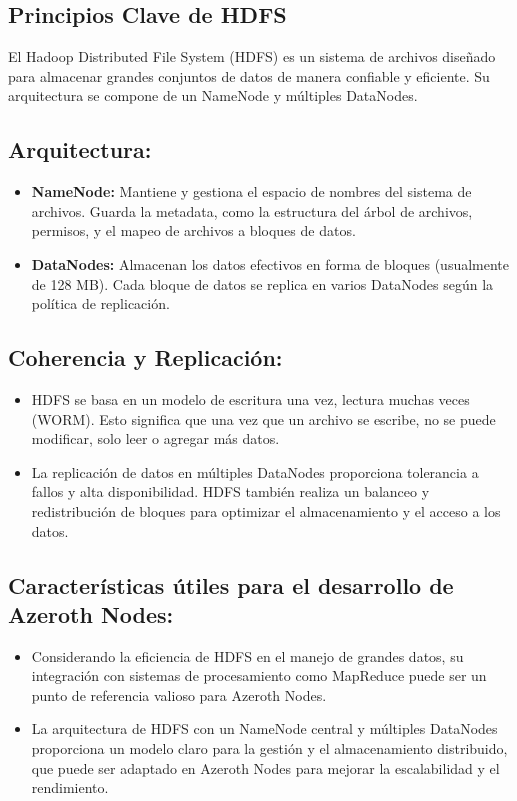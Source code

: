 \subsection{Principios Clave de HDFS}

El Hadoop Distributed File System (HDFS) es un sistema de archivos diseñado para almacenar grandes conjuntos de datos de manera confiable y eficiente. Su arquitectura se compone de un NameNode y múltiples DataNodes.

\subsection{Arquitectura:}

\begin{itemize}
    \item \textbf{NameNode:} Mantiene y gestiona el espacio de nombres del sistema de archivos. Guarda la metadata, como la estructura del árbol de archivos, permisos, y el mapeo de archivos a bloques de datos.
    \item \textbf{DataNodes:} Almacenan los datos efectivos en forma de bloques (usualmente de 128 MB). Cada bloque de datos se replica en varios DataNodes según la política de replicación.
\end{itemize}

\subsection{Coherencia y Replicación:}

\begin{itemize}
    \item HDFS se basa en un modelo de escritura una vez, lectura muchas veces (WORM). Esto significa que una vez que un archivo se escribe, no se puede modificar, solo leer o agregar más datos.
    \item La replicación de datos en múltiples DataNodes proporciona tolerancia a fallos y alta disponibilidad. HDFS también realiza un balanceo y redistribución de bloques para optimizar el almacenamiento y el acceso a los datos.
\end{itemize}

\subsection{Características útiles para el desarrollo de Azeroth Nodes:}

\begin{itemize}
    \item Considerando la eficiencia de HDFS en el manejo de grandes datos, su integración con sistemas de procesamiento como MapReduce puede ser un punto de referencia valioso para Azeroth Nodes.
    \item La arquitectura de HDFS con un NameNode central y múltiples DataNodes proporciona un modelo claro para la gestión y el almacenamiento distribuido, que puede ser adaptado en Azeroth Nodes para mejorar la escalabilidad y el rendimiento.
\end{itemize}

